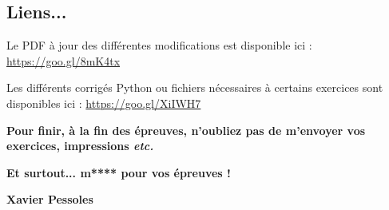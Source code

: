 \documentclass[10pt,fleqn]{article} %
\begin{document}
\subsection*{Liens...}

Le PDF à jour des différentes modifications est disponible ici : \url{https://goo.gl/8mK4tx}

Les différents corrigés Python ou fichiers nécessaires à certains exercices sont disponibles ici : \url{https://goo.gl/XiIWH7}


\begin{flushright}
\textbf{Pour finir, à la fin des épreuves, n'oubliez pas de m'envoyer vos exercices, impressions \textit{etc.}}

\textbf{Et surtout... m**** pour vos épreuves !}

\textbf{Xavier Pessoles}
\end{flushright}

\newpage
\end{document}

